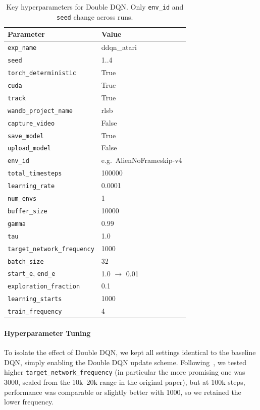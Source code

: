 \begin{table}
	\caption{Key hyperparameters for Double DQN. Only \texttt{env\_id} and \texttt{seed} change across runs.}
	\label{tab:ddqn_hyperparams}
	\centering
	\begin{tabular}{ll}
		\toprule
		\textbf{Parameter} & \textbf{Value} \\
		\midrule
		\texttt{exp\_name}                & ddqn\_atari \\
		\texttt{seed}                     & 1..4 \\
		\texttt{torch\_deterministic}     & True \\
		\texttt{cuda}                     & True \\
		\texttt{track}                    & True \\
		\texttt{wandb\_project\_name}     & rlsb \\
		\texttt{capture\_video}           & False \\
		\texttt{save\_model}              & True \\
		\texttt{upload\_model}            & False \\
		\texttt{env\_id}                  & e.g.\ AlienNoFrameskip-v4 \\
		\texttt{total\_timesteps}         & 100000 \\
		\texttt{learning\_rate}           & 0.0001 \\
		\texttt{num\_envs}                & 1 \\
		\texttt{buffer\_size}             & 10000 \\
		\texttt{gamma}                    & 0.99 \\
		\texttt{tau}                      & 1.0 \\
		\texttt{target\_network\_frequency} & 1000 \\
		\texttt{batch\_size}             & 32 \\
		\texttt{start\_e}, \texttt{end\_e} & 1.0 $\to$ 0.01 \\
		\texttt{exploration\_fraction}    & 0.1 \\
		\texttt{learning\_starts}         & 1000 \\
		\texttt{train\_frequency}         & 4 \\
		\bottomrule
	\end{tabular}
\end{table}

\paragraph{Hyperparameter Tuning}
To isolate the effect of Double DQN, we kept all settings identical to the baseline DQN, simply enabling the Double DQN update scheme. 
Following~\cite{van:double_q}, we tested higher \texttt{target\_network\_frequency} (in particular the more promising one was \num{3000}, scaled from the 10k--20k range in the original paper), but at 100k steps, performance was comparable or slightly better with 1000, so we retained the lower frequency. 

